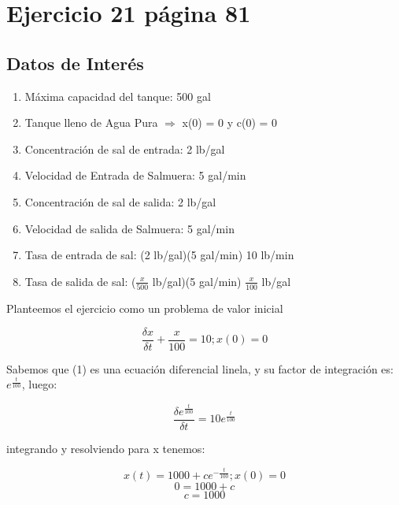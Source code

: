 \documentclass{article}
\begin{document}
    \section{Ejercicio 21 página 81}

        \subsection{Datos de Interés}
        \begin{enumerate}
            \item Máxima capacidad del tanque: 500 gal
            \item Tanque lleno de Agua Pura $\Rightarrow$ x(0) = 0 y c(0) = 0
            \item Concentración de sal de entrada: 2 lb/gal
            \item Velocidad de Entrada de Salmuera: 5 gal/min
            \item Concentración de sal de salida: 2 lb/gal
            \item Velocidad de salida de Salmuera: 5 gal/min
            \item Tasa de entrada de sal: (2 lb/gal)(5 gal/min) 10 lb/min
            \item Tasa de salida de sal: ($\frac{x}{500}$ lb/gal)(5 gal/min) $\frac{x}{100}$ lb/gal  
        \end{enumerate}

        Planteemos el ejercicio como un problema de valor inicial

        \begin{equation}
            \frac{\delta x}{\delta t} + \frac{x}{100} = 10; x(0) = 0
        \end{equation}

        Sabemos que (1) es una ecuación diferencial linela, y su factor de integración es: $e^{\frac{t}{100}}$, luego:

        \begin{equation}
            \frac{\delta e^{\frac{t}{100}}}{\delta t} = 10 e^{\frac{t}{100}}
        \end{equation}

        integrando y resolviendo para x tenemos:

        \[ x(t) = 1000 + c e^{-\frac{t}{100}} ; x(0) = 0\]
        \[0 = 1000+c\]
        \[c = 1000\]

        \begin{center}
        \end{center}
    
\end{document}

